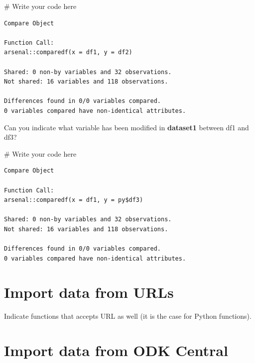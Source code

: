 \documentclass[
  letterpaper,
  DIV=11,
  numbers=noendperiod]{scrreprt}
\newenvironment{Shaded}{\begin{snugshade}}{\end{snugshade}}
\newcommand{\CommentTok}[1]{\textcolor[rgb]{0.37,0.37,0.37}{#1}}
\begin{document}
\begin{Shaded}
\begin{Highlighting}[]
\CommentTok{\# Write your code here}
\end{Highlighting}
\end{Shaded}

\begin{verbatim}
Compare Object

Function Call: 
arsenal::comparedf(x = df1, y = df2)

Shared: 0 non-by variables and 32 observations.
Not shared: 16 variables and 118 observations.

Differences found in 0/0 variables compared.
0 variables compared have non-identical attributes.
\end{verbatim}

Can you indicate what variable has been modified in \textbf{dataset1}
between df1 and df3?

\begin{Shaded}
\begin{Highlighting}[]
\CommentTok{\# Write your code here}
\end{Highlighting}
\end{Shaded}

\begin{verbatim}
Compare Object

Function Call: 
arsenal::comparedf(x = df1, y = py$df3)

Shared: 0 non-by variables and 32 observations.
Not shared: 16 variables and 118 observations.

Differences found in 0/0 variables compared.
0 variables compared have non-identical attributes.
\end{verbatim}


\hypertarget{import-data-from-urls}{%
\chapter{Import data from URLs}\label{import-data-from-urls}}

Indicate functions that accepts URL as well (it is the case for Python
functions).


\hypertarget{import-data-from-odk-central}{%
\chapter{Import data from ODK
Central}\label{import-data-from-odk-central}}
\end{document}

